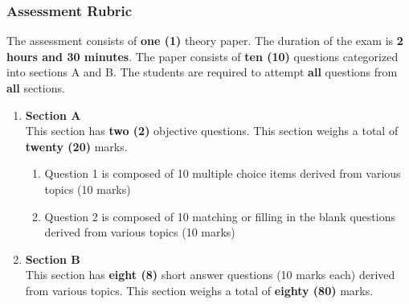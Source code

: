 \subsubsection{Assessment Rubric}
\noindent The assessment consists of \textbf{one (1)} theory paper. The duration of the exam is \textbf{2 hours and 30 minutes}. The paper consists of \textbf{ten (10)} questions categorized into sections A and B. The students are required to attempt \textbf{all} questions from \textbf{all} sections. 
\begin{enumerate}
	\item \textbf{Section A} \\
	This section has \textbf{two (2)} objective questions. This section weighs a total of \textbf{twenty (20)} marks.
	\begin{enumerate}
		\item Question 1 is composed of 10 multiple choice items derived from various topics (10 marks)
		\item Question 2 is composed of 10 matching or filling in the blank questions derived from various topics (10 marks)
	\end{enumerate}
	
	\item \textbf{Section B} \\
	This section has \textbf{eight (8)} short answer questions (10 marks each) derived from various topics. This section weighs a total of \textbf{eighty (80)} marks.
\end{enumerate}

